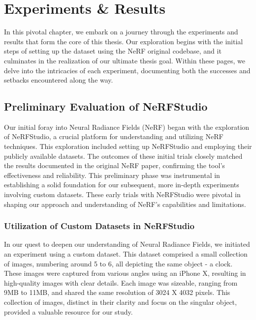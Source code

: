 \chapter{Experiments \& Results}\label{ch:Experiments & Results}

In this pivotal chapter, we embark on a journey through the experiments and results that form the core of this thesis. Our exploration begins with the initial steps of setting up the dataset using the NeRF original codebase, and it culminates in the realization of our ultimate thesis goal. Within these pages, we delve into the intricacies of each experiment, documenting both the successes and setbacks encountered along the way.

\section{Preliminary Evaluation of NeRFStudio}


Our initial foray into Neural Radiance Fields (NeRF) began with the exploration of NeRFStudio, a crucial platform for understanding and utilizing NeRF techniques. This exploration included setting up NeRFStudio and employing their publicly available datasets. The outcomes of these initial trials closely matched the results documented in the original NeRF paper, confirming the tool's effectiveness and reliability. This preliminary phase was instrumental in establishing a solid foundation for our subsequent, more in-depth experiments involving custom datasets. These early trials with NeRFStudio were pivotal in shaping our approach and understanding of NeRF's capabilities and limitations.

\subsection{Utilization of Custom Datasets in NeRFStudio}


In our quest to deepen our understanding of Neural Radiance Fields, we initiated an experiment using a custom dataset. This dataset comprised a small collection of images, numbering around 5 to 6, all depicting the same object - a clock. These images were captured from various angles using an iPhone X, resulting in high-quality images with clear details. Each image was sizeable, ranging from 9MB to 11MB, and shared the same resolution of 3024 X 4032 pixels. This collection of images, distinct in their clarity and focus on the singular object, provided a valuable resource for our study. 
\vspace{10pt}

